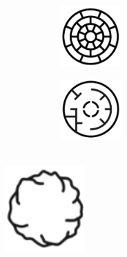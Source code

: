 \documentclass{article}\usepackage[]{graphicx}\usepackage[]{color}
\begin{document}
 \begin{figure}[h]
 \centering
 \begin{subfigure}{0.25\textwidth}
 \centering
 \includegraphics[width=0.9\linewidth]{imag/cu_des}
 \end{subfigure}
 \begin{subfigure}{0.25\textwidth}
 \centering
 \includegraphics[width=0.9\linewidth]{imag/planos}
 \end{subfigure}
 \end{figure}
 ~\\
\vbox{
    \centering
    \includegraphics[width=0.23\textwidth]{imag/esferas}
}
\clearpage
\end{document}
